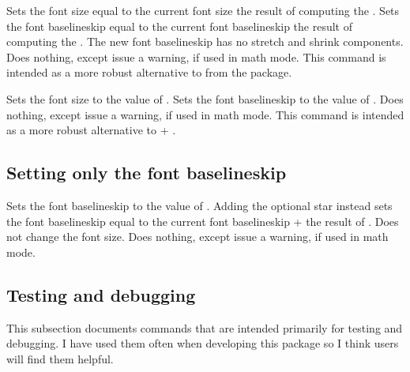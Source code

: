 \documentclass{beery}
\begin{document}
\begin{displaycode}
   
\end{displaycode}

Sets the font size equal to the current font size \texttimes{} the result of computing the .
Sets the font baselineskip equal to the current font baselineskip \texttimes{} the result of computing the .
The new font baselineskip has no stretch and shrink components.
Does nothing, except issue a warning, if used in math mode.
This command is intended as a more robust alternative to  from the  package.

\begin{displaycode}
    
\end{displaycode}

Sets the font size to the value of .
Sets the font baselineskip to the value of .
Does nothing, except issue a warning, if used in math mode.
This command is intended as a more robust alternative to  + .

\subsection{Setting only the font baselineskip}
\label{subsec:setfontbaselineskip}

\begin{displaycode}
   \sarg{} 
\end{displaycode}

Sets the font baselineskip to the value of .
Adding the optional star \sarg{} instead sets the font baselineskip equal to the current font baselineskip + the result of .
Does not change the font size.
Does nothing, except issue a warning, if used in math mode.

\subsection{Testing and debugging}
\label{subsec:debug}

This subsection documents commands that are intended primarily for testing and debugging.
I have used them often when developing this package so I think users will find them helpful.
\end{document}
